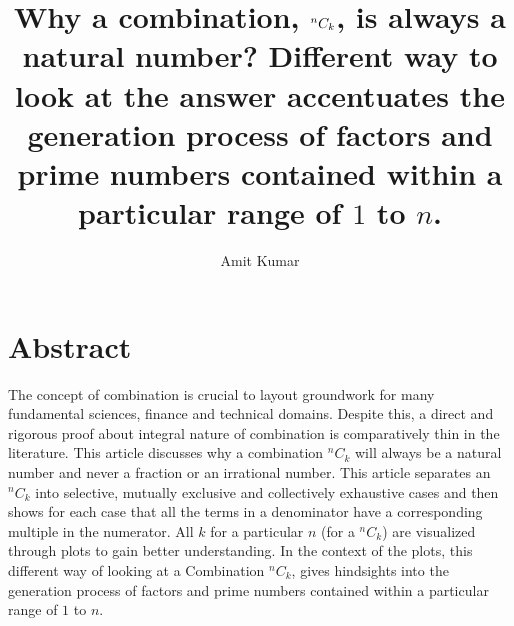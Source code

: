\documentclass[12pt, twoside]{article}
\title{Why a combination, $\Combination{n}{k}$, is always a natural number? Different way to look at the answer accentuates the generation process of factors and prime numbers contained within a particular range of $1$ to $n$.}
\author{Amit Kumar}
\date{}
\newcommand*{\Combination}[2]{{}^{#1}C_{#2}}%
\begin{document}
	\maketitle
	\section{Abstract}
	 The concept of combination is crucial to layout groundwork for many fundamental sciences, finance and technical domains. Despite this, a direct and rigorous proof about integral nature of combination is comparatively thin in the literature. This article discusses why a combination $\Combination{n}{k}$ will always be a natural number and never a fraction or an irrational number. This article separates an $\Combination{n}{k}$ into selective, mutually exclusive and collectively exhaustive cases and then shows for each case that all the terms in a denominator have a corresponding multiple in the numerator. All $k$ for a particular $n$ (for a $\Combination{n}{k}$) are visualized through plots to gain better understanding. In the context of the plots, this different way of looking at a Combination $\Combination{n}{k}$, gives hindsights into the generation process of factors and prime numbers contained within a particular range of $1$ to $n$.
\end{document}
